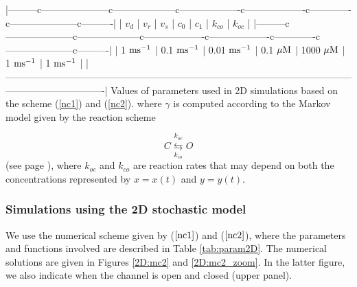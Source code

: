 |---------c---------------------c--------------------c-------------------c-------------------c-------------c---------------------c----------|
| $v_d$            | $v_r$              | $v_s$               | $c_0$             | $c_1$            | $k_{co}$         | $k_{oc}$          | 
|---------c---------------------c--------------------c-------------------c-------------------c-------------c---------------------c----------|
| 1 $\rm{ms^{-1}}$ | 0.1 $\rm{ms^{-1}}$ | 0.01 $\rm{ms^{-1}}$ |  0.1 $\rm{\mu M}$ | 1000 $\rm{\mu M}$ | 1 $\rm{ms^{-1}}$ | 1 $\rm{ms^{-1}}$ |
|-------------------------------------------------------------------------------------------------------------------------------------------|
Values of parameters used in 2D simulations based on the scheme (\ref{nc1}) and (\ref{nc2}). %
where $\gamma$ is computed according to the Markov model given by the reaction scheme

\begin{equation}
C\underset{k_{co}}{\overset{k_{oc}}{\leftrightarrows}}O \label{Markov2}
\end{equation}
(see page \pageref{numscheme}),
where $k_{oc}$ and $k_{co}$ are reaction rates that may depend on both the concentrations
represented by $x=x(t)$ and $y=y(t)$.

\subsubsection{Simulations using the 2D stochastic model}


We use the numerical scheme given by ($\ref{nc1}$) and ($\ref{nc2}$), where the parameters and functions involved are described in Table \ref{tab:param2D}. The numerical solutions are given in Figures \ref{2D:mc2} and \ref{2D:mc2_zoom}. In the latter figure, we also indicate when the channel is open and closed (upper panel).

